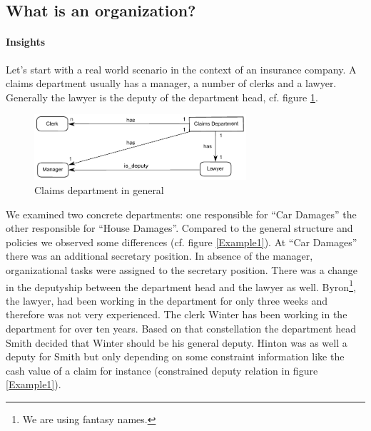 \subsection{What is an organization?}

\paragraph{Insights}
Let's start with a real world scenario in the context of an insurance company. A claims department usually has a manager, a number of clerks and a lawyer. Generally the lawyer is the deputy of the department head, cf. figure \ref{GeneralDep}. 
	\begin{figure}[htb!]
	\centering
	\includegraphics[width=0.7\textwidth]{Figures/ExampleDepartmentGeneral.pdf}
	\caption{Claims department in general}
	\label{GeneralDep}
	\end{figure}

We examined two concrete departments: one responsible for ``Car Damages'' the other responsible for ``House Damages''. Compared to the general structure and policies we observed some differences (cf. figure \ref{Example1}). At ``Car Damages'' there was an additional secretary position. In absence of the manager, organizational tasks were assigned to the secretary position. There was a change in the deputyship between the department head and the lawyer as well. Byron\footnote{We are using fantasy names.}, the lawyer, had been working in the department for only three weeks and therefore was not very experienced. The clerk Winter has been working in the department for over ten years. Based on that constellation the department head Smith decided that Winter should be his general deputy. Hinton was as well a deputy for Smith but only depending on some constraint information like the cash value of a claim for instance (constrained deputy relation in figure \ref{Example1}). 
	
